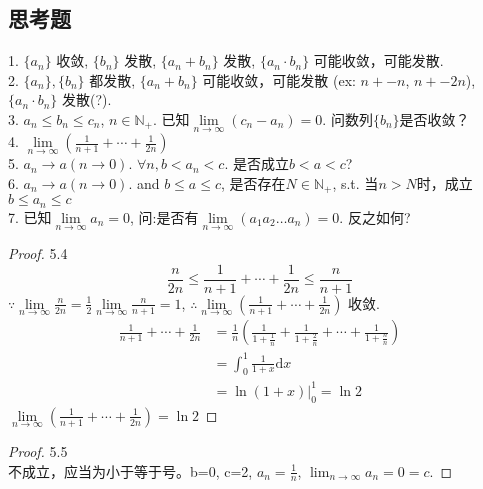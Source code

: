 \subsection{思考题}
\begin{qs}
	1. $ \{a_n\} $ 收敛, $ \{b_n\} $ 发散, $ \{a_n+b_n\} $ 发散,  $ \{a_n\cdot b_n\} $ 可能收敛，可能发散.\\
	2. $ \{a_n\}, \{b_n\} $ 都发散, $ \{a_n+b_n\} $ 可能收敛，可能发散 (ex: $ n+-n $,   $n+-2n $),  $ \{a_n\cdot b_n\} $ 发散(?).\\
	3. $ a_n\leqslant b_n \leqslant c_n $, $ n\in\mathbb{N}_+ $. 已知$ \lim\limits_{n\rightarrow\infty}(c_n-a_n)=0 $. 问数列$ \{b_n\} $是否收敛？\\
	4. $ \lim\limits_{n\rightarrow\infty}(\frac{1}{n+1} + \cdots + \frac{1}{2n}) $\\
	5. $ a_n\rightarrow a(n\rightarrow 0) $. $ \forall n, b<a_n<c $. 是否成立$ b<a<c $?\\
	6. $ a_n \rightarrow a(n\rightarrow 0) $. and $ b\leqslant a\leqslant c  $, 是否存在$ N\in\mathbb{N}_+ $, s.t. 当$ n>N $时，成立$ b\leqslant a_n \leqslant c$\\
	7. 已知$ \lim\limits_{n\rightarrow\infty}a_n = 0 $, 问:是否有$ \lim\limits_{n\rightarrow\infty} (a_1a_2\dots a_n) = 0 $. 反之如何?
\end{qs}
\begin{proof}5.4\\
	\begin{equation*}
		 \frac{n}{2n} \leqslant \frac{1}{n+1} + \cdots + \frac{1}{2n}  \leqslant \frac{n}{n+1}
	\end{equation*}
	$ \because 
	\lim\limits_{n\rightarrow\infty} 
	\frac{n}{2n} = \frac{1}{2}
	\lim\limits_{n\rightarrow\infty} 
	\frac{n}{n+1} = 1
	$, $ \therefore \lim\limits_{n\rightarrow\infty}(\frac{1}{n+1} + \cdots + \frac{1}{2n} ) $ 收敛.
	\begin{align*}
		\frac{1}{n+1} + \cdots + \frac{1}{2n}
		&= \frac{1}{n}(\frac{1}{1+\frac{1}{n}} + \frac{1}{1+\frac{2}{n}} + \cdots + \frac{1}{1+\frac{n}{n}})\\
		&= \int_{0}^{1}\frac{1}{1+x}\text{d}x\\
		&= \ln(1+x)|_0^1 = \ln{2}
	\end{align*}
	$ \lim\limits_{n\rightarrow\infty}(\frac{1}{n+1} + \cdots + \frac{1}{2n})=\ln{2}  $	
\end{proof}
\begin{proof}5.5\\
	不成立，应当为小于等于号。b=0, c=2, $ a_n = \frac{1}{n} $, $ \lim_{n\rightarrow\infty}a_n = 0 = c $.
\end{proof}
